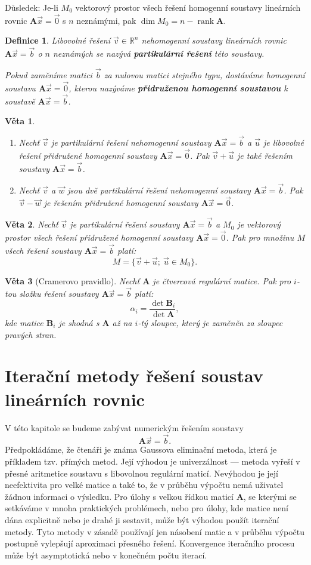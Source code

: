 \documentclass{article}
\newtheorem{df}{Definice}
\newtheorem{veta}{Věta}
\newcommand{\0}{\vec{0}}
\newcommand{\A}{\mat A}
\newcommand{\B}{\mat B}
\newcommand{\bb}{\vec{b}}
\newcommand{\mat}[1]{\mathbf{#1}}
\newcommand{\R}{\mathbb R}
\newcommand{\rank}{\operatorname{rank}}
\newcommand{\uu}{\vec{u}}
\newcommand{\xx}{\vec{x}}
\begin{document}
Důsledek: Je-li $M_0$ vektorový prostor všech řešení homogenní soustavy lineárních rovnic $\A\xx=\0$ s $n$ neznámými, pak $\dim M_0=n-\rank\A$.
  
\begin{df}
Libovolné řešení $\vec v\in\R^n$ nehomogenní soustavy lineárních rovnic $\A\xx=\bb$ o $n$ neznámých se nazývá {\bf partikulární řešení} této soustavy.

Pokud zaměníme matici $\bb$ za nulovou matici stejného typu, dostáváme homogenní soustavu $\A\xx=\0$, kterou nazýváme {\bf přidruženou homogenní soustavou} k soustavě $\A\xx=\bb$.
\end{df}
  
\begin{veta}
\begin{enumerate}
\item Nechť $\vec v$ je partikulární řešení nehomogenní soustavy $\A\xx=\bb$ a $\uu$ je libovolné řešení přidružené homogenní soustavy $\A\xx=\0$.
Pak $\vec v+\uu$ je také řešením soustavy $\A\xx=\bb$.
\item Nechť $\vec v$ a $\vec w$ jsou dvě partikulární řešení nehomogenní soustavy $\A\xx=\bb$.
Pak $\vec v-\vec w$ je řešením přidružené homogenní soustavy $\A\xx=\0$.
\end{enumerate}
\end{veta}
  
\begin{veta}
Nechť $\vec v$ je partikulární řešení soustavy $\A\xx=\bb$ a $M_0$ je vektorový prostor všech řešení přidružené homogenní soustavy $\A\xx=\0$.
Pak pro množinu $M$ všech řešení soustavy $\A\xx=\bb$ platí:
$$ M=\{\vec v+\uu;~\uu\in M_0\}. $$
\end{veta}
  
\begin{veta}[Cramerovo pravidlo]
Nechť $\A$ je čtvercová regulární matice.
Pak pro $i$-tou složku řešení soustavy $\A\xx=\bb$ platí:
$$ \alpha_i = \frac{\det\B_i}{\det\A}, $$
kde matice $\B_i$ je shodná s $\A$ až na $i$-tý sloupec, který je zaměněn za sloupec pravých stran.
\end{veta}



\section{Iterační metody řešení soustav lineárních rovnic}

V této kapitole se budeme zabývat numerickým řešením soustavy
$$ \A\xx=\bb. $$
Předpokládáme, že čtenáři je známa Gaussova eliminační metoda, která je pří\-kla\-dem tzv. přímých metod.
Její výhodou je univerzálnost --- metoda vyřeší v přesné aritmetice soustavu s libovolnou regulární maticí.
Nevýhodou je její neefektivita pro velké matice a také to, že v průběhu výpočtu nemá uživatel žádnou informaci o výsledku.
Pro úlohy s velkou řídkou maticí $\A$, se kterými se setkáváme v mnoha praktických problémech, nebo pro úlohy, kde matice není dána explicitně nebo je drahé ji sestavit, může být výhodou použít iterační metody.
Tyto metody v zásadě používají jen násobení matic a v průběhu výpočtu postupně vylepšují aproximaci přesného řešení.
Konvergence iteračního procesu může být asymptotická nebo v konečném počtu iterací.
\end{document}
